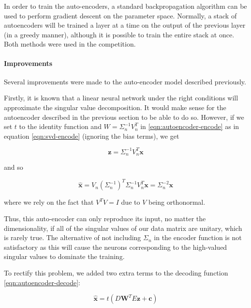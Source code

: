 \documentclass{article}
\begin{document}
In order to train the auto-encoders, a standard backpropagation algorithm can be used to perform gradient descent on the parameter space.  Normally, a stack of autoencoders will be trained a layer at a time on the output of the previous layer (in a greedy manner), although it is possible to train the entire stack at once.  Both methods were used in the competition.

\paragraph{Improvements}

Several improvements were made to the auto-encoder model described previously.

Firstly, it is known that a linear neural network under the right conditions will approximate the singular value decomposition.  It would make sense for the autoencoder described in the previous section to be able to do so.  However, if we set $t$ to the identity function and $W = \Sigma_n^{-1} V_n^T$ in \ref{eqn:autoencoder-encode} as in equation \ref{eqn:svd-encode} (ignoring the bias terms), we get

\begin{equation}
\mathbf{z} = \Sigma_n^{-1} V_n^T \mathbf{x}
\end{equation}

and so

\begin{equation}
\hat{\mathbf{x}} = V_n \left( \Sigma_n^{-1} \right)^T \Sigma_n^{-1} V_n^T \mathbf{x} = \Sigma_n^{-2} \mathbf{x}
\end{equation}

where we rely on the fact that $V^T V = I$ due to $V$ being orthonormal.

Thus, this auto-encoder can only reproduce its input, no matter the dimensionality, if all of the singular values of our data matrix are unitary, which is rarely true.  The alternative of not including $\Sigma_n$ in the encoder function is not satisfactory as this will cause the neurons corresponding to the high-valued singular values to dominate the training.

To rectify this problem, we added two extra terms to the decoding function \ref{eqn:autoencoder-decode}:

\begin{equation}
\label{eqn:autoencoder-decode-improved}
\hat{\mathbf{x}} = t(D \mathbf{W}^T E \mathbf{z} + \mathbf{c})
\end{equation}
\end{document}
